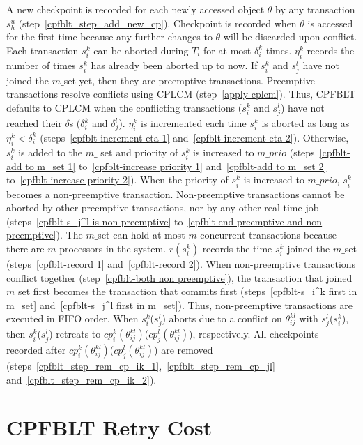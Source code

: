 \documentclass[preprint]{sigplanconf}
\begin{document}
%
A new checkpoint is recorded for each newly accessed object $\theta$ by any transaction $s_h^u$ (step~\ref{cpfblt_step_add_new_cp}). Checkpoint is recorded when $\theta$ is accessed for the first time because any further changes to $\theta$ will be discarded upon conflict. Each transaction $s_{i}^{k}$ can be aborted during $T_i$ for at most $\delta_{i}^{k}$ times. $\eta_{i}^{k}$ records  the number of times $s_{i}^{k}$ has already been aborted up to now. If $s_i^k$ and $s_j^l$ have not joined the $m\_$set yet, then they are preemptive transactions. Preemptive transactions resolve conflicts using CPLCM (step~\ref{apply cplcm}). Thus, CPFBLT defaults to CPLCM when the conflicting transactions ($s_i^k$ and $s_j^l$) have not reached their $\delta$s ($\delta_i^k$ and $\delta_j^l$). $\eta_i^k$ is incremented each time $s_{i}^k$ is aborted as long as $\eta_i^k < \delta_i^k$ (steps~\ref{cpfblt-increment eta 1} and~\ref{cpfblt-increment eta 2}). Otherwise, $s_i^k$ is added to the $m\_$ set and priority of $s_{i}^k$ is increased to $m\_prio$ (steps~\ref{cpfblt-add to m_set 1} to~\ref{cpfblt-increase priority 1} and~\ref{cpfblt-add to m_set 2} to~\ref{cpfblt-increase priority 2}). When the priority of $s_i^k$ is increased to $m\_prio$, $s_i^k$ becomes a non-preemptive transaction. Non-preemptive transactions cannot be aborted by other preemptive transactions, nor by any other real-time job (steps~\ref{cpfblt-s_j^l is non preemptive} to~\ref{cpfblt-end preemptive and non preemptive}). The $m\_$set can hold at most $m$ concurrent transactions because there are $m$ processors in the system. $r(s_i^k)$ records the time $s_i^k$ joined the $m\_$set (steps~\ref{cpfblt-record 1} and~\ref{cpfblt-record 2}). When non-preemptive transactions conflict together (step~\ref{cpfblt-both non preemptive}), the transaction that joined $m\_$set first becomes the transaction that commits first (steps~\ref{cpfblt-s_i^k first in m_set} and~\ref{cpfblt-s_j^l first in m_set}). Thus, non-preemptive transactions are executed in FIFO order. When $s_i^k$($s_j^l$) aborts due to a conflict on $\theta_{ij}^{kl}$ with $s_j^l$($s_i^k$), then $s_i^k$($s_j^l$) retreats to $cp_i^k(\theta_{ij}^{kl})$($cp_j^l(\theta_{ij}^{kl})$), respectively. All checkpoints recorded after $cp_i^k(\theta_{ij}^{kl})$($cp_j^l(\theta_{ij}^{kl})$) are removed (steps~\ref{cpfblt_step_rem_cp_ik_1},~\ref{cpfblt_step_rem_cp_jl} and~\ref{cpfblt_step_rem_cp_ik_2}). 

\section{CPFBLT Retry Cost}\label{sec:cpfblt rc}
\end{document}
